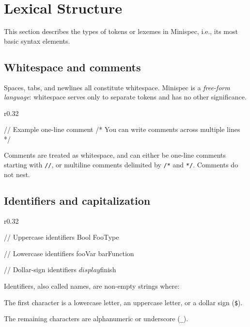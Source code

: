 \section{Lexical Structure}
\label{sec:lexical}

This section describes the types of tokens or lexemes in Minispec, i.e., its most basic syntax elements.

\subsection{Whitespace and comments}

Spaces, tabs, and newlines all constitute whitespace.
Minispec is a \emph{free-form language}: whitespace serves only to separate tokens and has no other significance.

\begin{wrapfigure}{r}{0.32\columnwidth}
\vspace{-2em}
\begin{mscode}
// Example one-line comment
/* You can write comments
   across multiple lines */
\end{mscode}
\vspace{-2em}
\end{wrapfigure}
Comments are treated as whitespace, and can either be one-line comments starting with \texttt{//},
or multiline comments delimited by \texttt{/*} and \texttt{*/}. Comments do not nest.

\subsection{Identifiers and capitalization}
\label{sec:identifiers}

\begin{wrapfigure}{r}{0.32\columnwidth}
\vspace{-2em}
\begin{mscode}
// Uppercase identifiers
Bool
FooType

// Lowercase identifiers
fooVar
barFunction

// Dollar-sign identifiers
$display
$finish
\end{mscode}
\vspace{-4em}
\end{wrapfigure}

Identifiers, also called names, are non-empty strings where:
\begin{compactitem}
\item The first character is a lowercase letter, an uppercase letter, or a dollar sign (\texttt{\$}).
\item The remaining characters are alphanumeric or underscore (\texttt{\_}).
\end{compactitem}


